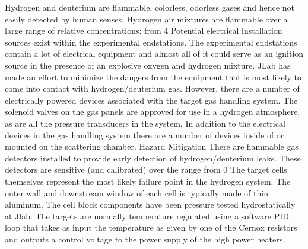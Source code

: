 {{{	Hydrogen and deuterium are flammable, colorless, odorless gases and hence not easily detected by human senses. Hydrogen air mixtures are flammable over a large range of relative concentrations: from 4%
	Potential electrical installation sources exist within the experimental endstations. The experimental endstations contain a lot of electrical equipment and almost all of it could serve as an ignition source in the presence of an explosive oxygen and hydrogen mixture. JLab has made an effort to minimize the dangers from the equipment that is most likely to come into contact with hydrogen/deuterium gas. However, there are a number of electrically powered devices associated with the target gas handling system. The solenoid valves on the gas panels are approved for use in a hydrogen atmosphere, as are all the pressure transducers in the system. In addition to the electrical devices in the gas handling system there are a number of devices inside of or mounted on the scattering chamber. 
Hazard Mitigation
	There are flammable gas detectors installed to provide early detection of hydrogen/deuterium leaks. These detectors are sensitive (and calibrated) over the range from 0%
	The target cells themselves represent the most likely failure point in the hydrogen system. The outer wall and downstream window of each cell is typically made of thin aluminum. The cell block components have been pressure tested hydrostatically at Jlab. The targets are normally temperature regulated using a software PID loop that takes as input the temperature as given by one of the Cernox resistors and outputs a control voltage to the power supply of the high power heaters.
}}}

